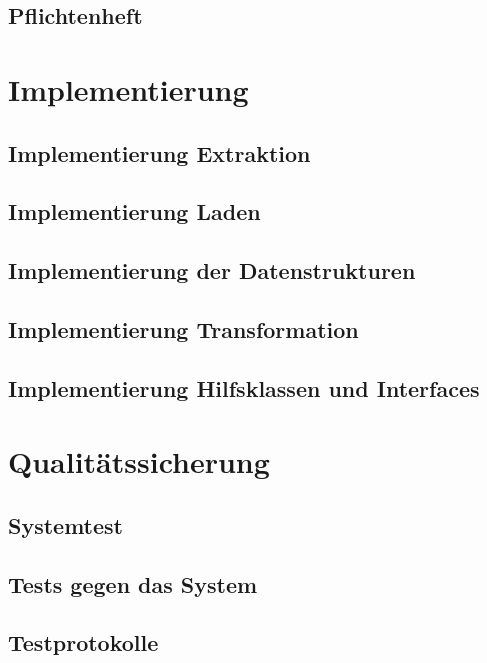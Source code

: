 \documentclass[11pt,toc=sectionentrywithoutdots, headheight=44pt, headings=optiontoheadandtoc]{scrartcl}
\begin{document}
\subsection{Pflichtenheft}
\blindtext

\section{Implementierung}
\blindtext

\subsection{Implementierung Extraktion}
\blindtext

\subsection{Implementierung Laden}
\blindtext

\subsection{Implementierung der Datenstrukturen}
\blindtext

\subsection{Implementierung Transformation}
\blindtext

\subsection{Implementierung Hilfsklassen und Interfaces}
\blindtext

\section{Qualitätssicherung}
\blindtext

\subsection{Systemtest}
\blindtext

\subsection{Tests gegen das System}
\blindtext

\subsection{Testprotokolle}
\blindtext\
\end{document}
